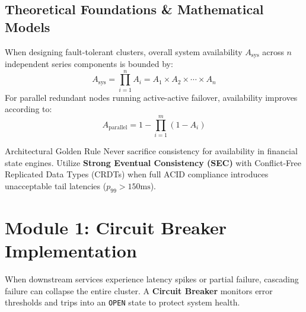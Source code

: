 \documentclass[11pt, a4paper, parskip=half]{scrartcl}
\begin{document}
\subsection{Theoretical Foundations \& Mathematical Models}

When designing fault-tolerant clusters, overall system availability $A_{\text{sys}}$ across $n$ independent series components is bounded by:
\begin{equation}
    A_{\text{sys}} = \prod_{i=1}^{n} A_i = A_1 \times A_2 \times \cdots \times A_n
\end{equation}
For parallel redundant nodes running active-active failover, availability improves according to:
\begin{equation}
    A_{\text{parallel}} = 1 - \prod_{i=1}^{m} (1 - A_i)
\end{equation}

\begin{infobox}{Architectural Golden Rule}
    Never sacrifice consistency for availability in financial state engines. Utilize \textbf{Strong Eventual Consistency (SEC)} with Conflict-Free Replicated Data Types (CRDTs) when full ACID compliance introduces unacceptable tail latencies ($p_{99} > 150\text{ms}$).
\end{infobox}

\newpage


\section{Module 1: Circuit Breaker Implementation}

When downstream services experience latency spikes or partial failure, cascading failure can collapse the entire cluster. A \textbf{Circuit Breaker} monitors error thresholds and trips into an \texttt{OPEN} state to protect system health.
\end{document}
